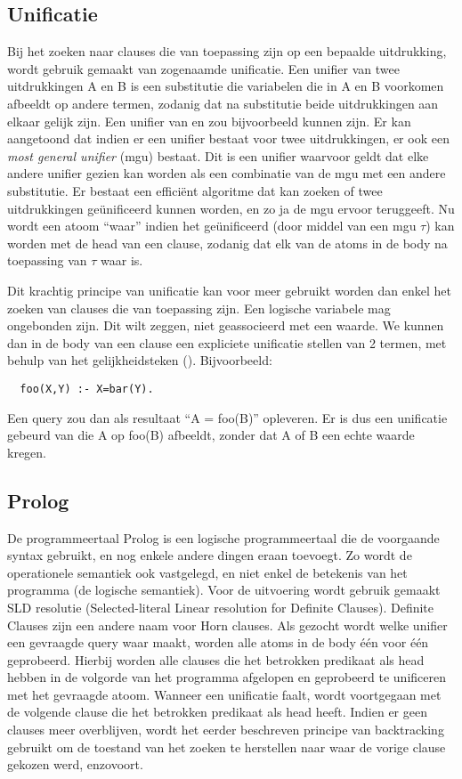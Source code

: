 \subsection{Unificatie}
Bij het zoeken naar clauses die van toepassing zijn op een bepaalde uitdrukking, wordt gebruik gemaakt van zogenaamde unificatie. Een unifier van twee uitdrukkingen A en B is een substitutie die variabelen die in A en B voorkomen afbeeldt op andere termen, zodanig dat na substitutie beide uitdrukkingen aan elkaar gelijk zijn. Een unifier van  en  zou bijvoorbeeld  kunnen zijn. Er kan aangetoond dat indien er een unifier bestaat voor twee uitdrukkingen, er ook een {\em most general unifier} (mgu) bestaat. Dit is een unifier waarvoor geldt dat elke andere unifier gezien kan worden als een combinatie van de mgu met een andere substitutie. Er bestaat een effici\"ent algoritme dat kan zoeken of twee uitdrukkingen ge\"unificeerd kunnen worden, en zo ja de mgu ervoor teruggeeft. Nu wordt een atoom ``waar'' indien het ge\"unificeerd (door middel van een mgu $\tau$) kan worden met de head van een clause, zodanig dat elk van de atoms in de body na toepassing van $\tau$ waar is.

Dit krachtig principe van unificatie kan voor meer gebruikt worden dan enkel het zoeken van clauses die van toepassing zijn. Een logische variabele mag ongebonden zijn. Dit wilt zeggen, niet geassocieerd met een waarde. We kunnen dan in de body van een clause een expliciete unificatie stellen van 2 termen, met behulp van het gelijkheidsteken (\code{=}). Bijvoorbeeld: \begin{Verbatim}
  foo(X,Y) :- X=bar(Y).
\end{Verbatim}
Een query  zou dan als resultaat ``A = foo(B)'' opleveren. Er is dus een unificatie gebeurd van die A op foo(B) afbeeldt, zonder dat A of B een echte waarde kregen.

\subsection{Prolog}
De programmeertaal Prolog is een logische programmeertaal die de voorgaande syntax gebruikt, en nog enkele andere dingen eraan toevoegt. Zo wordt de operationele semantiek ook vastgelegd, en niet enkel de betekenis van het programma (de logische semantiek). Voor de uitvoering wordt gebruik gemaakt SLD resolutie (Selected-literal Linear resolution for Definite Clauses). Definite Clauses zijn een andere naam voor Horn clauses. Als gezocht wordt welke unifier een gevraagde query waar maakt, worden alle atoms in de body \'e\'en voor \'e\'en geprobeerd. Hierbij worden alle clauses die het betrokken predikaat als head hebben in de volgorde van het programma afgelopen en geprobeerd te unificeren met het gevraagde atoom. Wanneer een unificatie faalt, wordt voortgegaan met de volgende clause die het betrokken predikaat als head heeft. Indien er geen clauses meer overblijven, wordt het eerder beschreven principe van backtracking gebruikt om de toestand van het zoeken te herstellen naar waar de vorige clause gekozen werd, enzovoort.

